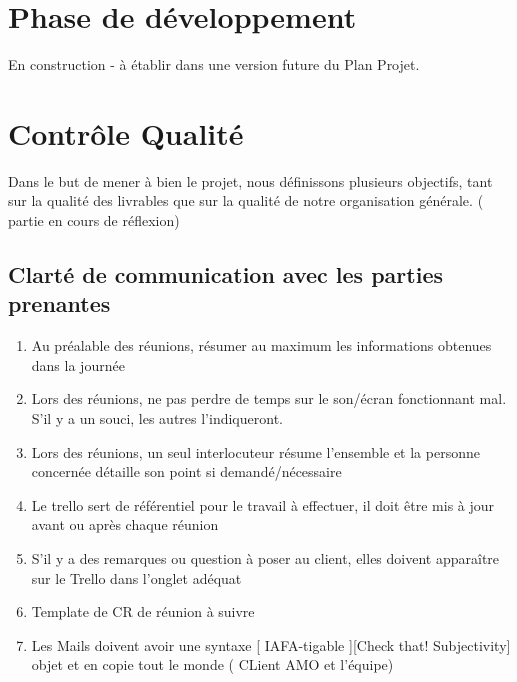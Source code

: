 \documentclass[11pt]{rapport_class}
\begin{document}
\chapter{Phase de développement}
\centerline{En construction - à établir dans une version future du Plan Projet.}





\chapter{Contrôle Qualité}
\label{Controle}
\qquad Dans le but de mener à bien le projet, nous définissons plusieurs objectifs, tant sur la qualité des livrables que sur la qualité de notre organisation générale. ( partie en cours de réflexion) 

\section{Clarté de communication avec les parties prenantes}
\begin{enumerate}
    \item Au préalable des réunions, résumer au maximum les informations obtenues dans la journée
    \item Lors des réunions, ne pas perdre de temps sur le son/écran fonctionnant mal. S'il y a un souci, les autres l'indiqueront.
    \item Lors des réunions, un seul interlocuteur résume l'ensemble et la personne concernée détaille son point si demandé/nécessaire
    \item Le trello sert de référentiel pour le travail à effectuer, il doit être mis à jour avant ou après chaque réunion 
    \item S'il y a des remarques ou question à poser au client, elles doivent apparaître sur le Trello dans l'onglet adéquat
    \item Template de CR de réunion à suivre
    \item Les Mails doivent avoir une syntaxe [ IAFA-tigable ][Check that! Subjectivity] objet et en copie tout le monde ( CLient AMO et l'équipe)
\end{enumerate}
\end{document}
